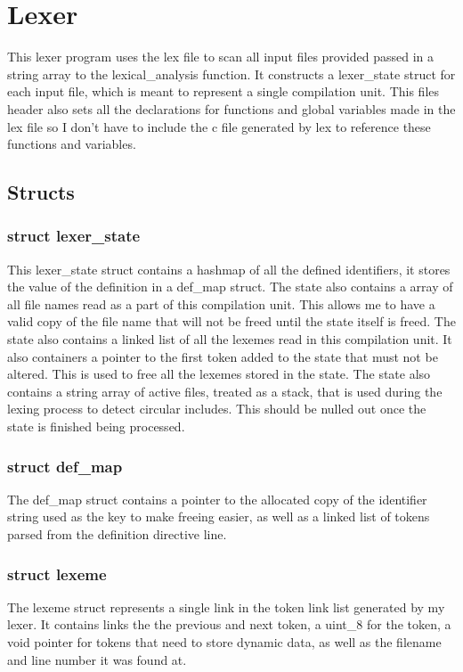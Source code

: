 \documentclass[11pt]{article}
\begin{document}
    \section{Lexer}
        This lexer program uses the lex file to scan all input files provided passed in a string array to the lexical\_analysis function.
        It constructs a lexer\_state struct for each input file, which is meant to represent a single compilation unit. This files
        header also sets all the declarations for functions and global variables made in the lex file so I don't have to include the 
        c file generated by lex to reference these functions and variables.
        
        \subsection{Structs}

            \subsubsection{struct lexer\_state}
                This lexer\_state struct contains a hashmap of all the defined identifiers, it stores the value of the definition in a def\_map struct.
                The state also contains a array of all file names read as a part of this compilation unit. This allows me to have a valid copy of the
                file name that will not be freed until the state itself is freed. The state also contains a linked list of all the lexemes read 
                in this compilation unit. It also containers a pointer to the first token added to the state that must not be altered. This is 
                used to free all the lexemes stored in the state. The state also contains a string array of active files, treated as a stack,
                that is used during the lexing process to detect circular includes. This should be nulled out once the state is finished being processed. 
            
            \subsubsection{struct def\_map}
                The def\_map struct contains a pointer to the allocated copy of the identifier string used as the key to make freeing easier,
                as well as a linked list of tokens parsed from the definition directive line.

            \subsubsection{struct lexeme}
                The lexeme struct represents a single link in the token link list generated by my lexer.
                It contains links the the previous and next token, a uint\_8 for the token, a void pointer 
                for tokens that need to store dynamic data, as well as the filename and line number it was found at.
\end{document}
